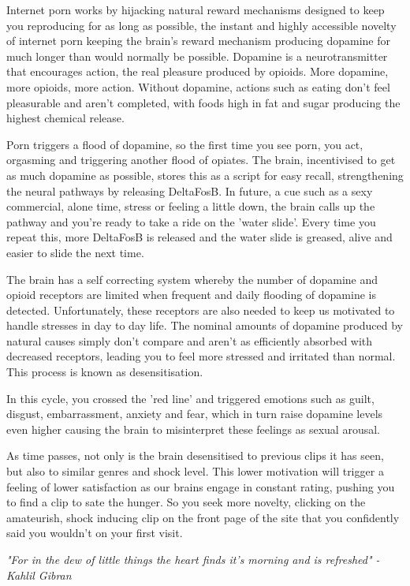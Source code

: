 \documentclass[easypeasy.tex]{subfiles}
\begin{document}
Internet porn works by hijacking natural reward mechanisms designed to keep you reproducing for as long as possible, the instant and highly accessible novelty of internet porn keeping the brain's reward mechanism producing dopamine for much longer than would normally be possible. Dopamine is a neurotransmitter that encourages action, the real pleasure produced by opioids. More dopamine, more opioids, more action. Without dopamine, actions such as eating don't feel pleasurable and aren't completed, with foods high in fat and sugar producing the highest chemical release.

Porn triggers a flood of dopamine, so the first time you see porn, you act, orgasming and triggering another flood of opiates. The brain, incentivised to get as much dopamine as possible, stores this as a script for easy recall, strengthening the neural pathways by releasing DeltaFosB. In future, a cue such as a sexy commercial, alone time, stress or feeling a little down, the brain calls up the pathway and you're ready to take a ride on the 'water slide'. Every time you repeat this, more DeltaFosB is released and the water slide is greased, alive and easier to slide the next time.

The brain has a self correcting system whereby the number of dopamine and opioid receptors are limited when frequent and daily flooding of dopamine is detected. Unfortunately, these receptors are also needed to keep us motivated to handle stresses in day to day life. The nominal amounts of dopamine produced by natural causes simply don't compare and aren't as efficiently absorbed with decreased receptors, leading you to feel more stressed and irritated than normal. This process is known as desensitisation.

In this cycle, you crossed the 'red line' and triggered emotions such as guilt, disgust, embarrassment, anxiety and fear, which in turn raise dopamine levels even higher causing the brain to misinterpret these feelings as sexual arousal.

As time passes, not only is the brain desensitised to previous clips it has seen, but also to similar genres and shock level. This lower motivation will trigger a feeling of lower satisfaction as our brains engage in constant rating, pushing you to find a clip to sate the hunger. So you seek more novelty, clicking on the amateurish, shock inducing clip on the front page of the site that you confidently said you wouldn't on your first visit.

\textit{"For in the dew of little things the heart finds it's morning and is refreshed" - Kahlil Gibran}
\end{document}
